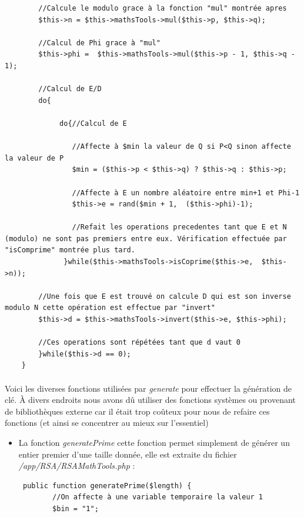 \documentclass[12pt,a4paper]{report}
\begin{document}
\begin{itemize}
\begin{lstlisting}
        //Calcule le modulo grace à la fonction "mul" montrée apres
        $this->n = $this->mathsTools->mul($this->p, $this->q);
        
        //Calcul de Phi grace à "mul"
        $this->phi =  $this->mathsTools->mul($this->p - 1, $this->q - 1);
        
        //Calcul de E/D
        do{
        
             do{//Calcul de E
             
                //Affecte à $min la valeur de Q si P<Q sinon affecte la valeur de P
                $min = ($this->p < $this->q) ? $this->q : $this->p;
                
                //Affecte à E un nombre aléatoire entre min+1 et Phi-1
                $this->e = rand($min + 1,  ($this->phi)-1);
                
                //Refait les operations precedentes tant que E et N (modulo) ne sont pas premiers entre eux. Vérification effectuée par "isComprime" montrée plus tard.
              }while($this->mathsTools->isCoprime($this->e,  $this->n));
        
        //Une fois que E est trouvé on calcule D qui est son inverse modulo N cette opération est effectue par "invert"
        $this->d = $this->mathsTools->invert($this->e, $this->phi);
        
        //Ces operations sont répétées tant que d vaut 0
        }while($this->d == 0);
    }
\end{lstlisting}

\paragraph{}
Voici les diverses fonctions utilisées par \textit{generate} pour effectuer la génération de clé. À divers endroits nous avons dû utiliser des fonctions systèmes ou provenant de bibliothèques externe car il était trop coûteux pour nous de refaire ces fonctions (et ainsi se concentrer au mieux sur l'essentiel)\\
\begin{itemize}

\item La fonction \textit{generatePrime} cette fonction permet simplement de générer un entier premier d'une taille donnée, elle est extraite du fichier \textit{/app/RSA/RSAMathTools.php} :
\lstset{}
\begin{lstlisting}
 public function generatePrime($length) {
        //On affecte à une variable temporaire la valeur 1
        $bin = "1";
        

\end{lstlisting}
\end{itemize}
\end{itemize}
\end{document}
